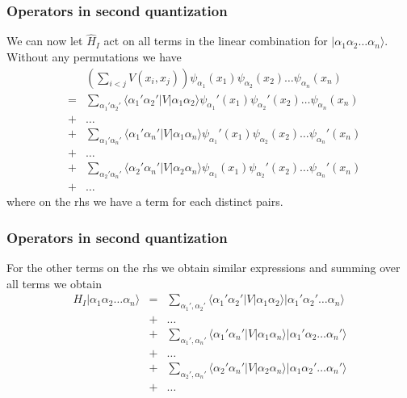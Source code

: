 \documentclass[compress]{beamer}
\newcommand*{\ket}[1]{|#1\rangle}
\newcommand*{\bra}[1]{\langle#1|}
\newcommand{\element}[3]
        {\bra{#1}#2\ket{#3}}
\begin{document}
\frame
{
  \frametitle{Operators in second quantization}
\begin{small}
{\scriptsize
We can now let $\hat{H}_I$ act on all terms in the linear combination for $\ket{\alpha_1\alpha_2\dots\alpha_n}$. Without any permutations we have
\begin{eqnarray}
	&& \left( \sum_{i<j} V(x_i,x_j) \right) \psi_{\alpha_1}(x_1)\psi_{\alpha_2}(x_2)\dots \psi_{\alpha_n}(x_n) \nonumber \\
	&=& \sum_{\alpha_1'\alpha_2'} \element{\alpha_1'\alpha_2'}{V}{\alpha_1\alpha_2}
		\psi_{\alpha_1}'(x_1)\psi_{\alpha_2}'(x_2)\dots \psi_{\alpha_n}(x_n) \nonumber \\
	& +& \dots \nonumber \\
	&+& \sum_{\alpha_1'\alpha_n'} \element{\alpha_1'\alpha_n'}{V}{\alpha_1\alpha_n}
		\psi_{\alpha_1}'(x_1)\psi_{\alpha_2}(x_2)\dots \psi_{\alpha_n}'(x_n) \nonumber \\
	& +& \dots \nonumber \\
	&+& \sum_{\alpha_2'\alpha_n'} \element{\alpha_2'\alpha_n'}{V}{\alpha_2\alpha_n}
		\psi_{\alpha_1}(x_1)\psi_{\alpha_2}'(x_2)\dots \psi_{\alpha_n}'(x_n) \nonumber \\
	 & +& \dots \label{eq:2-33}
\end{eqnarray}
where on the rhs we have a term for each distinct pairs. 
}
\end{small}
}



\frame
{
  \frametitle{Operators in second quantization}
\begin{small}
{\scriptsize
For the other terms on the rhs we obtain similar expressions  and summing over all terms we obtain
\begin{eqnarray}
	H_I \ket{\alpha_1\alpha_2\hdots\alpha_n} &=& \sum_{\alpha_1', \alpha_2'} \element{\alpha_1'\alpha_2'}{V}{\alpha_1\alpha_2}
		\ket{\alpha_1'\alpha_2'\hdots\alpha_n} \nonumber \\
	&+& \hdots \nonumber \\
	&+& \sum_{\alpha_1', \alpha_n'} \element{\alpha_1'\alpha_n'}{V}{\alpha_1\alpha_n}
		\ket{\alpha_1'\alpha_2\hdots\alpha_n'} \nonumber \\
	&+& \hdots \nonumber \\
	&+& \sum_{\alpha_2', \alpha_n'} \element{\alpha_2'\alpha_n'}{V}{\alpha_2\alpha_n}
		\ket{\alpha_1\alpha_2'\hdots\alpha_n'} \nonumber \\
	 &+& \hdots \label{eq:2-34}
\end{eqnarray}
}
\end{small}
}
\end{document}
